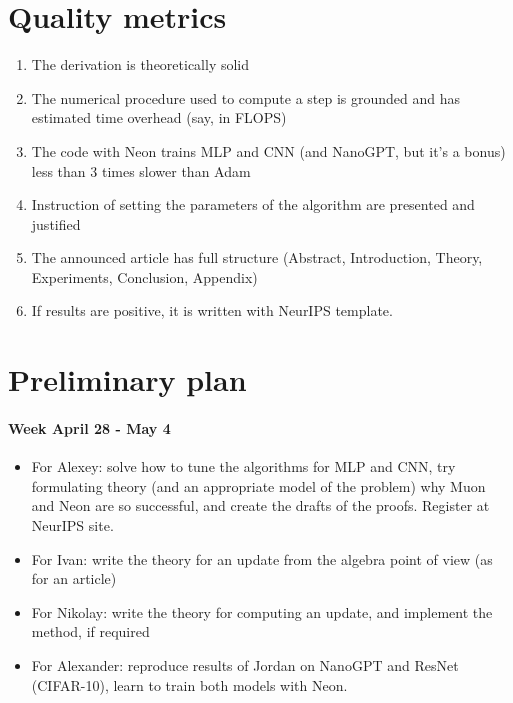 \documentclass{article} %
\begin{document}
\section{Quality metrics}
\begin{enumerate}
    \item The derivation is theoretically solid
    \item The numerical procedure used to compute a step is grounded and has estimated time overhead (say, in FLOPS)
    \item The code with Neon trains MLP and CNN (and NanoGPT, but it's a bonus) less than 3 times slower than Adam
    \item Instruction of setting the parameters of the algorithm are presented and justified
    \item The announced article has full structure (Abstract, Introduction, Theory, Experiments, Conclusion, Appendix)
    \item If results are positive, it is written with NeurIPS template.
\end{enumerate}

\section{Preliminary plan}
\paragraph{Week April 28 - May 4}
\begin{itemize}
    \item For Alexey: solve how to tune the algorithms for MLP and CNN, try formulating theory (and an appropriate model of the problem) why Muon and Neon are so successful, and create the drafts of the proofs. Register at NeurIPS site.
    
    \item For Ivan: write the theory for an update from the algebra point of view (as for an article)
    
    \item For Nikolay: write the theory for computing an update, and implement the method, if required
    
    \item For Alexander: reproduce results of Jordan on NanoGPT and ResNet (CIFAR-10), learn to train both models with Neon.
\end{itemize}
\end{document}

